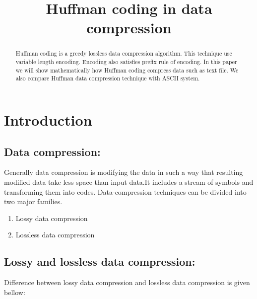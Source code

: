 \documentclass[conference]{IEEEtran}
\begin{document}
\title{Huffman coding in data compression}
\author{

}

\date{}
\maketitle


\begin{abstract}
Huffman coding is a greedy lossless data compression algorithm. This technique  use   variable length encoding. Encoding also satisfies prefix rule of encoding. In this paper we will show mathematically how Huffman coding  compress data such as text file. We also compare Huffman data compression technique with ASCII system.
    
\end{abstract}
\section{Introduction}
\label{sec:intro}
\subsection{\textbf{Data compression:}}
Generally data compression is modifying the data in such a way that resulting modified data take less space than input data.It includes a stream of symbols and transforming them into codes\cite{nelson1995data}.
Data-compression techniques can be divided into two major families.\cite{nelson1995data}


 \begin{enumerate}
 \label{list:into1}
 \item Lossy data compression
  \item Lossless data compression
  
\end{enumerate}

\subsection{\textbf{Lossy and lossless data compression:}}
Difference between lossy data compression and lossless data compression is given bellow:
\end{document}

